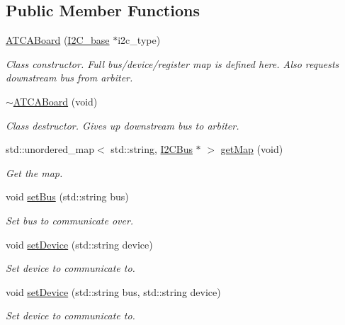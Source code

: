\subsection*{Public Member Functions}
\begin{DoxyCompactItemize}
\item 
\hyperlink{class_a_t_c_a_board_a4046dcaa2d61102e91005f2845e06201}{A\+T\+C\+A\+Board} (\hyperlink{class_i2_c__base}{I2\+C\+\_\+base} $\ast$i2c\+\_\+type)
\begin{DoxyCompactList}\small\item\em Class constructor. Full bus/device/register map is defined here. Also requests downstream bus from arbiter. \end{DoxyCompactList}\item 
\hyperlink{class_a_t_c_a_board_a4f51f5462bd42562a1cdd20eb3a3bfeb}{$\sim$\+A\+T\+C\+A\+Board} (void)
\begin{DoxyCompactList}\small\item\em Class destructor. Gives up downstream bus to arbiter. \end{DoxyCompactList}\item 
std\+::unordered\+\_\+map$<$ std\+::string, \hyperlink{class_i2_c_bus}{I2\+C\+Bus} $\ast$ $>$ \hyperlink{class_a_t_c_a_board_a3926d4c4f9e4b98640b9b902b88ecb22}{get\+Map} (void)
\begin{DoxyCompactList}\small\item\em Get the map. \end{DoxyCompactList}\item 
void \hyperlink{class_a_t_c_a_board_a7aeb3e3e9488e3e016bc844b3eb0f36b}{set\+Bus} (std\+::string bus)
\begin{DoxyCompactList}\small\item\em Set bus to communicate over. \end{DoxyCompactList}\item 
void \hyperlink{class_a_t_c_a_board_ad0395aa7fe27ed6602ea55dfbe10b24d}{set\+Device} (std\+::string device)
\begin{DoxyCompactList}\small\item\em Set device to communicate to. \end{DoxyCompactList}\item 
void \hyperlink{class_a_t_c_a_board_ac7e7f32ba0c3583b67d8fa0c6a4703b7}{set\+Device} (std\+::string bus, std\+::string device)
\begin{DoxyCompactList}\small\item\em Set device to communicate to. \end{DoxyCompactList}\end{DoxyCompactItemize}
